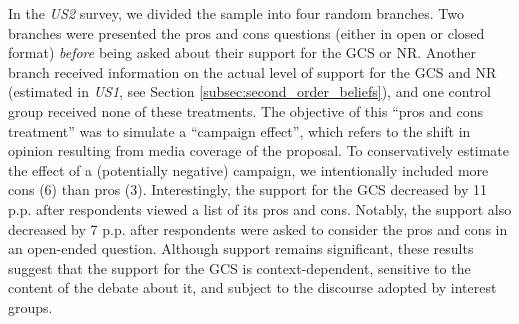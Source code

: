 In the \textit{US2} survey, we divided the sample into four random branches. Two branches were presented the pros and cons questions (either in open or closed format) \textit{before} being asked about their support for the GCS or NR. Another branch received information on the actual level of support for the GCS and NR (estimated in \textit{US1}, see Section \ref{subsec:second_order_beliefs}), and one control group received none of these treatments. %
The objective of this ``pros and cons treatment'' was to simulate a ``campaign effect'',\cite{anderson_can_2023} which refers to the shift in opinion resulting from media coverage of the proposal. To conservatively estimate the effect of a (potentially negative) campaign, we intentionally included more cons (6) than pros (3). Interestingly, the support for the GCS decreased by 11 p.p. after respondents viewed a list of its pros and cons. %
Notably, the support also decreased by 7 p.p. after respondents were asked to consider the pros and cons in an open-ended question. Although support remains significant, %
these results suggest that the support for the GCS is context-dependent, sensitive to the content of the debate about it, and subject to the discourse adopted by interest groups.



